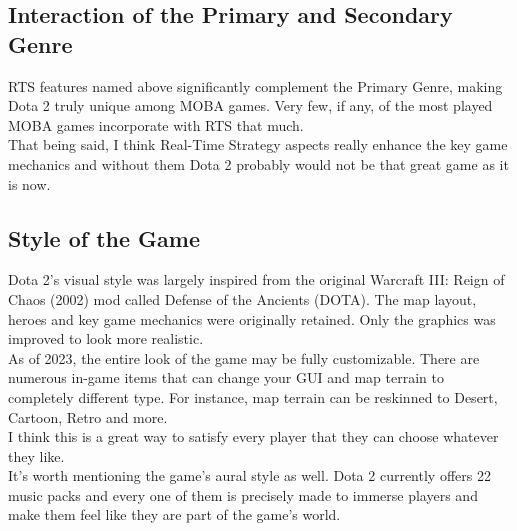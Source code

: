 \documentclass[a4paper,10pt,english]{article}
\begin{document}
\subsection*{Interaction of the Primary and Secondary Genre}

RTS features named above significantly complement the Primary Genre, making Dota 2 truly unique among MOBA games. Very few, if any, of the most played MOBA games incorporate with RTS that much. \\
That being said, I think Real-Time Strategy aspects really enhance the key game mechanics and without them Dota 2 probably would not be that great game as it is now.

\subsection*{Style of the Game}

Dota 2's visual style was largely inspired from the original Warcraft III: Reign of Chaos (2002) mod called Defense of the Ancients (DOTA). The map layout, heroes and key game mechanics were originally retained. Only the graphics was improved to look more realistic. \\
As of 2023, the entire look of the game may be fully customizable. There are numerous in-game items that can change your GUI and map terrain to completely different type. For instance, map terrain can be reskinned to Desert, Cartoon, Retro and more. \\
I think this is a great way to satisfy every player that they can choose whatever they like. \\ 
It's worth mentioning the game's aural style as well. Dota 2 currently offers 22 music packs and every one of them is precisely made to immerse players and make them feel like they are part of the game's world.
\end{document}

